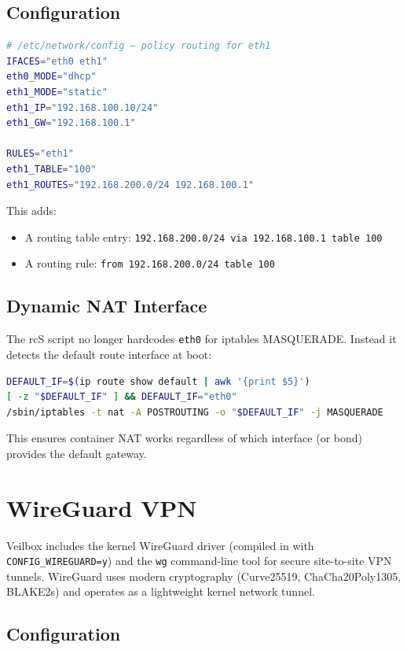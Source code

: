 \subsection{Configuration}

\begin{lstlisting}[language=bash]
# /etc/network/config — policy routing for eth1
IFACES="eth0 eth1"
eth0_MODE="dhcp"
eth1_MODE="static"
eth1_IP="192.168.100.10/24"
eth1_GW="192.168.100.1"

RULES="eth1"
eth1_TABLE="100"
eth1_ROUTES="192.168.200.0/24 192.168.100.1"
\end{lstlisting}

This adds:
\begin{itemize}[nosep]
  \item A routing table entry: \texttt{192.168.200.0/24 via 192.168.100.1
        table 100}
  \item A routing rule: \texttt{from 192.168.200.0/24 table 100}
\end{itemize}

\subsection{Dynamic NAT Interface}

The rcS script no longer hardcodes \texttt{eth0} for iptables MASQUERADE.
Instead it detects the default route interface at boot:

\begin{lstlisting}[language=bash]
DEFAULT_IF=$(ip route show default | awk '{print $5}')
[ -z "$DEFAULT_IF" ] && DEFAULT_IF="eth0"
/sbin/iptables -t nat -A POSTROUTING -o "$DEFAULT_IF" -j MASQUERADE
\end{lstlisting}

This ensures container NAT works regardless of which interface (or bond)
provides the default gateway.

\section{WireGuard VPN}

Veilbox includes the kernel WireGuard driver (compiled in with
\texttt{CONFIG\_WIREGUARD=y}) and the \texttt{wg} command-line tool for
secure site-to-site VPN tunnels. WireGuard uses modern cryptography
(Curve25519, ChaCha20Poly1305, BLAKE2s) and operates as a lightweight
kernel network tunnel.

\subsection{Configuration}

